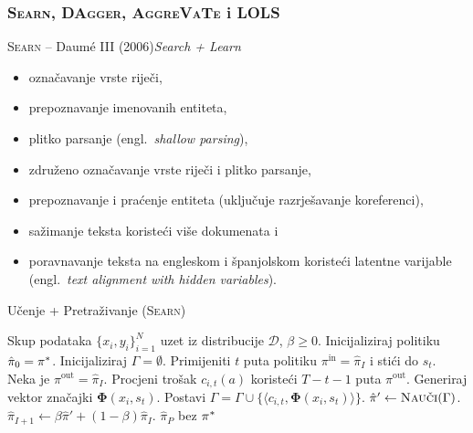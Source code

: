 \documentclass{beamer}
\makeatletter
\def\@fnsymbol#1{\ensuremath{\ifcase#1\or *\or \dagger\or \ddagger\or
   \mathsection\or \mathparagraph\or \|\or **\or \dagger\dagger
   \or \ddagger\ddagger \else\@ctrerr\fi}}
\newcommand{\ssymbol}[1]{^{\@fnsymbol{#1}}}
\newcommand{\engl}[1]{(engl.~\emph{#1})}
\makeatother
\begin{document}
\subsubsection{\protect\textsc{Searn}, \protect\textsc{DAgger},
\protect\textsc{AggreVaTe} i \protect\textsc{LOLS}}

\begin{frame}{\protect\textsc{Searn} -- Daumé III (2006)}{\protect\textit{Search + Learn}}
  \begin{itemize}
    \item označavanje vrste riječi,
    \item prepoznavanje imenovanih entiteta,
    \item plitko parsanje \engl{shallow parsing},
    \item združeno označavanje vrste riječi i plitko parsanje,
    \item prepoznavanje i praćenje entiteta (uključuje razrješavanje koreferenci),
    \item sažimanje teksta koristeći više dokumenata i
    \item poravnavanje teksta na engleskom i španjolskom koristeći latentne
    varijable \engl{text alignment with hidden variables}.
  \end{itemize}
\end{frame}

\begin{frame}{Učenje + Pretraživanje (\textsc{Searn})}
  \begin{algorithm}[H]
  \begin{algorithmic}[1]
  \Require Skup podataka $\{x_i, y_i\}_{i=1}^N$ uzet iz distribucije $\mathcal{D}$,
    $\beta \geq 0$. %
  \State Inicijaliziraj politiku $\hat{\pi}_0 = \pi\ssymbol{1}$.
  \ForAll{$I \in \big[0,1,2,\ldots,P)$}
      \State Inicijaliziraj $\Gamma = \emptyset$. 
        \State Primijeniti $t$ puta politiku $\pi^{\text{in}} = \hat{\pi}_{I}$  i stići do $s_t$. 
        \label{alg:searn:action}
          \State Neka je  $\pi^{\text{out}} = \hat{\pi}_{I}$.\label{alg:searn:rolloutpolicy}
          \State Procjeni trošak $c_{i,t}(a)$ koristeći $T-t-1$ puta $\pi^{\text{out}}$. \label{alg:searn:rollout}
        \EndFor
        \State Generiraj vektor značajki $\mathbf{\Phi}(x_i, s_t)$.
        \State Postavi $\Gamma = \Gamma \cup \{\langle c_{i,t}, \mathbf{\Phi}(x_i, s_t) \rangle\}$.
      \EndFor
    \EndFor
    \State $\hat{\pi}' \gets \textsc{Nauči}(\Gamma)$.\label{alg:searn:train}
    \State $\hat{\pi}_{I+1} \gets \beta \hat{\pi}' + (1-\beta) \hat{\pi}_{I}$. \label{alg:searn:mixture}
  \EndFor
  \State \Return $\hat{\pi}_{P}$ bez $\pi\ssymbol{1}$
  \end{algorithmic}
  \end{algorithm}
\end{frame}
\end{document}

